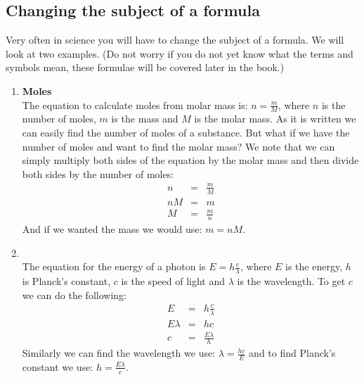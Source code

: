 \subsection*{Changing the subject of a formula}
Very often in science you will have to change the subject of a formula. We will look at two examples. (Do not worry if you do not yet know what the terms and symbols mean, these formulae will be covered later in the book.)
\begin{enumerate}[label=\textbf{\arabic*}.]
 \item \textbf{Moles}\\
The equation to calculate moles from molar mass is: $n = \frac{m}{M}$, where $n$ is the number of moles, $m$ is the mass and $M$ is the molar mass. As it is written we can easily find the number of moles of a substance. But what if we have the number of moles and want to find the molar mass? We note that we can simply multiply both sides of the equation by the molar mass and then divide both sides by the number of moles:
\begin{eqnarray*}
 n & = & \frac{m}{M} \\
nM & = & m \\
M & = & \frac{m}{n}
\end{eqnarray*}
And if we wanted the mass we would use: $m = nM$.
\item {}\\
The equation for the energy of a photon is $E = h\frac{c}{\lambda}$, where $E$ is the energy, $h$ is Planck's constant, $c$ is the speed of light and $\lambda$ is the wavelength. To get $c$ we can do the following:
\begin{eqnarray*}
 E & = & h\frac{c}{\lambda} \\
E \lambda & = & hc \\
c & = & \frac{E \lambda}{h}
\end{eqnarray*}  
Similarly we can find the wavelength we use: $\lambda = \frac{hc}{E}$ and to find Planck's constant we use: $h =  \frac{E \lambda}{c}$.
\end{enumerate}
